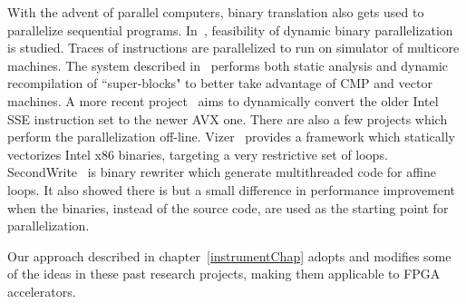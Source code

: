 With the advent of parallel computers, binary translation also gets used to parallelize sequential programs. In~\cite{yang2011feasibility}, feasibility of dynamic binary parallelization is studied. Traces of instructions are parallelized to run on simulator of multicore machines. 
The system described in~\cite{yardimci2008dynamic}  performs both static analysis and dynamic recompilation of ``super-blocks" to better take advantage of CMP and vector machines.
A more recent project~\cite{7363680} aims to dynamically convert the older Intel SSE instruction set to the newer AVX one.
There are also a few projects which perform the parallelization off-line.
Vizer~\cite{cooper2002vizer} provides a framework which statically vectorizes Intel x86 binaries, targeting a very restrictive set of loops. SecondWrite~\cite{Kotha:2010:APB:1934902.1934997} is binary rewriter which generate multithreaded code for affine loops. It also showed there is but a small difference in
performance improvement when the binaries, instead of the source code, are used
as the starting point for parallelization. 

Our approach described in chapter~\ref{instrumentChap} adopts and modifies some of the ideas in these past research projects, making them applicable to FPGA accelerators.


\begin{comment}
Optimizations targeting the native ISA can often be performed during translation, potentially providing performance improvement in a user transparent way. Systems like Dynamo~\cite{} Pin


Thus, most existing
software dynamic translation (SDT) systems, such as Dynamo [14], DynamoRio [15], Transmeta [26],
and Daisy [27], only perform alias analysis in the form of instruction inspection, which disambiguates
two memory references if they access either different memory regions or their addresses have the
same base register and different offsets.
Polyhedral Parallelization of Binary
Code
\end{comment}
